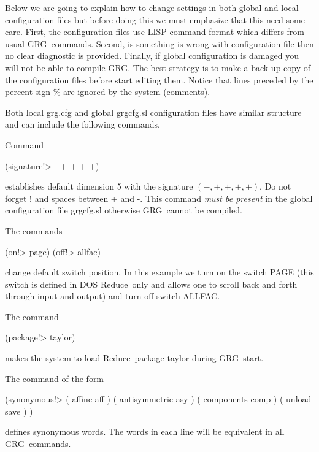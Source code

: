 \documentclass[twoside,openright]{report}
\newcommand{\grgtt}{\ttfamily}
\renewcommand{\tt}{\grgtt}
\newcommand{\grg}{{\sc GRG}}
\newcommand{\reduce}{{\sc Reduce}}
\newcommand{\file}[1]{{\sf#1}}
\newcommand{\comm}[1]{{\upshape\tt#1}}    %
\begin{document}
Below we are going to explain how to change settings in
both global and local configuration files but before
doing this we must emphasize that this need some care.
First, the configuration files use LISP command format
which  differs from  usual \grg\ commands.
Second, is something is wrong with configuration file
then no clear diagnostic is provided.
Finally, if global configuration is damaged you will
not be able to compile \grg. The best strategy is to
make a back-up copy of the configuration files before start
editing them.
Notice that lines preceded by the percent sign
\comm{\%} are ignored by the system (comments).

Both local \file{grg.cfg} and  global \file{grgcfg.sl}
configuration files have similar structure and can include
the following commands.

Command
\begin{listing}
   (signature!> - + + + +)
\end{listing}
establishes default dimension 5 with the signature
$\scriptstyle(-,+,+,+,+)$. Do not forget \comm{!} and spaces between
\comm{+} and \comm{-}. This command \emph{must be present}
in the global configuration file \file{grgcfg.sl}
otherwise \grg\ cannot be compiled.

The commands
\begin{listing}
   (on!> page)
   (off!> allfac)
\end{listing}
change default switch position. In this example we
turn on the switch \comm{PAGE} (this switch is defined
in DOS \reduce\ only and allows one to scroll back and forth
through input and output) and turn off switch
\comm{ALLFAC}.

The command
\begin{listing}
   (package!> taylor)
\end{listing}
makes the system to load \reduce\ package \file{taylor}
during \grg\ start.

The command of the form
\begin{listing}
  (synonymous!>
    ( affine aff                             )
    ( antisymmetric asy                      )
    ( components comp                        )
    ( unload save                            )
  )
\end{listing}
defines synonymous words. The words in each line will be
equivalent in all \grg\ commands.
\end{document}
